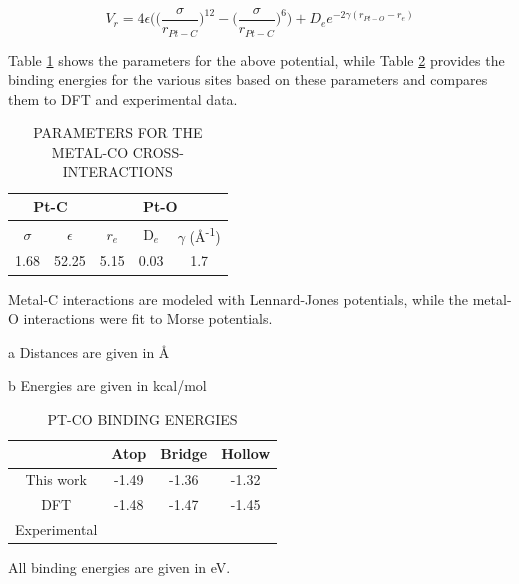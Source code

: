 \begin{equation}
V_{r} = 4\epsilon\bigg(\Big(\frac{\sigma}{r_{Pt-C}}\Big)^{12} - \Big(\frac{\sigma}{r_{Pt-C}}\Big)^{6}\bigg) + D_{e}e^{-2\gamma(r_{Pt-O}-r_{e})}
\end{equation}

Table \ref{table:pt-co} shows the parameters for the above potential, while
Table \ref{table:sites} provides the binding energies for the various sites
based on these parameters and compares them to DFT\citep{Deshlahra:2012aa} and
experimental data.\citep{}

\begin{table}
\caption{PARAMETERS FOR THE METAL-CO CROSS-INTERACTIONS}
\centering
\begin{threeparttable}
\centering
\begin{tabular}{c c c c c}
\hline
\hline
\multicolumn{2}{c}{Pt-C} & \multicolumn{3}{c}{Pt-O}  \\
\hline
$\sigma$\tnote{a} & $\epsilon$\tnote{b} & $r_{e}$\tnote{a} & $\mathrm{D}_e$\tnote{b} & $\gamma$ (\AA\textsuperscript{-1}) \\
\hline
1.68 & 52.25 & 5.15 & 0.03 & 1.7 \\
\hline
\hline
\end{tabular}
\begin{tablenotes}
  \item Metal-C interactions are modeled with Lennard-Jones potentials, while the metal-O interactions were fit to Morse potentials.
  \item[a] Distances are given in \AA
  \item[b] Energies are given in kcal/mol
\end{tablenotes}
\end{threeparttable}
\label{table:pt-co}
\end{table}

\begin{table}
\caption{PT-CO BINDING ENERGIES}
\centering
\begin{threeparttable}
\centering
\begin{tabular}{c c c c}
\hline
\hline
& Atop & Bridge & Hollow \\
\hline
This work & -1.49 & -1.36 & -1.32 \\
DFT \citep{Deshlahra:2012aa} & -1.48 & -1.47 & -1.45 \\
Experimental\citep{} & & & \\
\hline
\hline
\end{tabular}
\begin{tablenotes}
  \item All binding energies are given in eV.
\end{tablenotes}
\end{threeparttable}
\label{table:sites}
\end{table}



